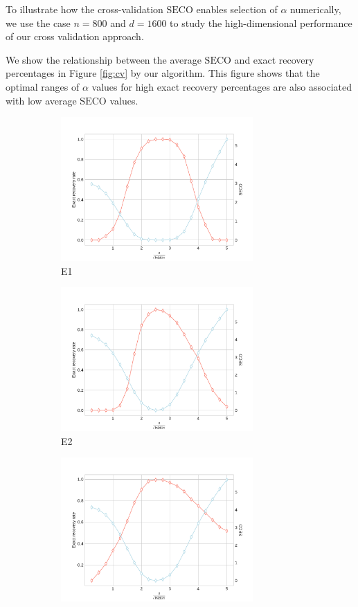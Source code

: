 \documentclass[11pt]{article}
\newcommand{\SECO}{\mathrm{SECO}}
\begin{document}
	To illustrate how the cross-validation $\SECO$ enables selection of $\alpha$ numerically, we use the case $n = 800$ and $d = 1600$ to study the high-dimensional performance of our cross validation approach. 
	
	We show the relationship between the average $\SECO$ and exact recovery percentages in Figure \ref{fig:cv} by our algorithm. This figure shows that the optimal ranges of $\alpha$ values for high exact recovery percentages are also associated with low average $\SECO$ values.
	
	\begin{figure}[!htp]
    
                \begin{subfigure}{.33\textwidth}
                  \centering
                  \includegraphics[width=.9\linewidth,height=5.5cm]{figure/model_1CV.pdf}
                  \caption{E1}
                  \label{fig:sfig_cv1}
                \end{subfigure}%
                \begin{subfigure}{.33\textwidth}
                  \centering
                  \includegraphics[width=.9\linewidth,height=5.5cm]{figure/model_2CV.pdf}
                  \caption{E2}
                  \label{fig:sfig_cv2}
                \end{subfigure}
                \begin{subfigure}{.33\textwidth}
                  \centering
                  \includegraphics[width=.9\linewidth,height=5.5cm]{figure/model_3CV.pdf}

\end{subfigure}
\end{figure}
\end{document}
